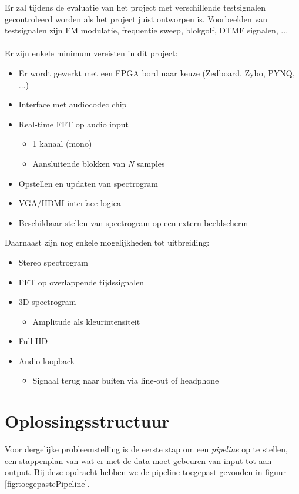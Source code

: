 \documentclass[a4paper,kul]{kulakarticle} %
\begin{document}
Er zal tijdens de evaluatie van het project met verschillende testsignalen gecontroleerd worden als het project juist ontworpen is. Voorbeelden van testsignalen zijn FM modulatie, frequentie sweep, blokgolf, DTMF signalen, ... \\
\\ Er zijn enkele minimum vereisten in dit project:
\begin{itemize}
	\item Er wordt gewerkt met een FPGA bord naar keuze (Zedboard, Zybo, PYNQ, ...)
	\item Interface met audiocodec chip
	\item Real-time FFT op audio input
	\begin{itemize}
		\item 1 kanaal (mono)
		\item Aansluitende blokken van \textit{N} samples
	\end{itemize}
	\item Opstellen en updaten van spectrogram
	\item VGA/HDMI interface logica
	\item Beschikbaar stellen van spectrogram op een extern beeldscherm
\end{itemize}
\vspace{4mm}
Daarnaast zijn nog enkele mogelijkheden tot uitbreiding:
\begin{itemize}
	\item Stereo spectrogram
	\item FFT op overlappende tijdssignalen
	\item 3D spectrogram
	\begin{itemize}
		\item Amplitude als kleurintensiteit
	\end{itemize}
	\item Full HD
	\item Audio loopback
	\begin{itemize}
		\item Signaal terug naar buiten via line-out of headphone
	\end{itemize}
\end{itemize}

\section{Oplossingsstructuur}
Voor dergelijke probleemstelling is de eerste stap om een \textit{pipeline} op te stellen, een stappenplan van wat er met de data moet gebeuren van input tot aan output. Bij deze opdracht hebben we de pipeline toegepast gevonden in figuur \ref{fig:toegepastePipeline}.
\end{document}
